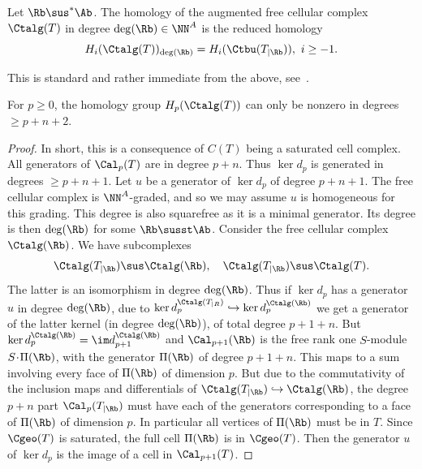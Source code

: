 \begin{fact} \label{fact:cell-hom} Let $\Rb \sus^* \Ab$. 
  The homology of the augmented free cellular complex $\Ctalg(T)$
  in degree $\deg(\Rb) \in \NN^A$ is the reduced homology
  \[ H_i({\Ctalg}(T))_{\deg(\Rb)} = {H}_i(\Ctbu(T_{|\Rb})),
    \, \, i \geq -1.\]
\end{fact}

This is standard and rather immediate from the above,
see~\cite[Section 4]{MiSt}.

\setcounter{cdrthm}{3}
\begin{prop} \label{pro:cellcx-homology}
  For $p \geq 0$, the homology group $ H_p({\Ctalg}(T))$
 can only be nonzero in degrees $\geq p+n+2$.
\end{prop}

\begin{proof}
  In short, this is a consequence of $C(T)$ being a saturated cell complex.
 All generators of $\Cal_p(T)$ are in degree $p+n$.
  Thus $\ker d_{p}$ is generated in degrees $\geq p+n+1$.
Let $u$ be a generator of $\ker d_p$ of degree $p+n+1$.
The free cellular complex is $\NN^A$-graded, and so we may assume $u$ is
  homogeneous for this grading.
  This degree  is also squarefree
  as it is a minimal generator. Its degree is then  $\deg(\Rb)$
  for some $\Rb \susst \Ab$.
  Consider the free cellular complex $\Ctalg(\Rb)$. We have subcomplexes
  \[ \Ctalg(T_{|\Rb}) \sus \Ctalg(\Rb), \quad \Ctalg(T_{|\Rb}) \sus \Ctalg(T).\]
The latter is an isomorphism in degree $\deg(\Rb)$. 
  Thus if $\ker d_{p}$ has a generator $u$ in degree $\deg(\Rb)$, due to
  $\ker d_p^{\Ctalg(T_{|R})} \hookrightarrow \ker d_p^{\Ctalg(\Rb)}$ we get
  a generator of the latter kernel (in degree $\deg(\Rb)$),
  of total degree $p+1+n$.
  But $\ker d_p^{\Ctalg(\Rb)} = \im d_{p+1}^{\Ctalg(\Rb)}$
and $\Cal_{p+1}(\Rb)$ is the free rank one $S$-module
  $S \! \overset{}{\cdot} \! {\Pi(\Rb)}$,  with the generator $\Pi(\Rb)$ of degree $p+1+n$.
  This maps to a sum involving every face of $\Pi(\Rb)$ of dimension
  $p$. But due to the commutativity of the inclusion maps and differentials
  of 
$\Ctalg(T_{|\Rb}) \hookrightarrow \Ctalg(\Rb)$, 
 the degree $p+n$ part $\Cal_p(T_{|\Rb})$ must have
 each of the generators corresponding to a face of $\Pi(\Rb)$
 of dimension $p$. 
  In particular all vertices of $\Pi(\Rb)$ must be in $T$.  Since
  $\Cgeo(T)$ is saturated, 
  the full cell $\Pi(\Rb)$ is in $\Cgeo(T)$.
  Then the generator 
  $u$ of $\ker d_p$ is the image of a cell in $\Cal_{p+1}(T)$. 
\end{proof}

